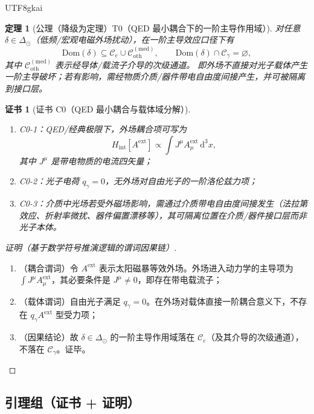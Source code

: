 \documentclass[12pt]{article}
\newtheorem{theorem}{定理}[section]
\newtheorem{Certificate}{证书}[section]
\begin{document}
\begin{CJK*}{UTF8}{gkai}
\begin{theorem}[公理（降级为定理）T0（QED 最小耦合下的一阶主导作用域）]
\label{thm:tex27-ch16b-t0}
对任意 $\delta\in\Delta_{\odot}$（低频/宏观电磁外场扰动），在一阶主导效应口径下有
\[
  \mathrm{Dom}(\delta)\subseteq
  \mathcal{C}_{e}\cup\mathcal{C}_{\mathrm{oth}}^{(\mathrm{med})},
  \qquad
  \mathrm{Dom}(\delta)\cap\mathcal{C}_{\gamma}=\varnothing,
\]
其中 $\mathcal{C}_{\mathrm{oth}}^{(\mathrm{med})}$ 表示经导体/载流子介导的次级通道。
即外场不直接对光子载体产生一阶主导破坏；若有影响，需经物质介质/器件带电自由度间接产生，并可被隔离到接口层。
\end{theorem}

\begin{Certificate}[证书 C0（QED 最小耦合与载体域分解）]
\label{cert:tex27-ch16b-c0}
\begin{enumerate}
  \item C0-1：QED/经典极限下，外场耦合项可写为
  \[
    H_{\mathrm{int}}[A^{\mathrm{ext}}]\propto \int J^\mu A^{\mathrm{ext}}_{\mu}\,\mathrm{d}^3x,
  \]
  其中 $J^\mu$ 是带电物质的电流四矢量；
  \item C0-2：光子电荷 $q_{\gamma}=0$，无外场对自由光子的一阶洛伦兹力项；
  \item C0-3：介质中光场若受外磁场影响，需通过介质带电自由度间接发生（法拉第效应、折射率微扰、器件偏置漂移等），其可隔离位置在介质/器件接口层而非光子本体。
\end{enumerate}
\end{Certificate}

\begin{proof}[证明（基于数学符号推演逻辑的谓词因果链）]
\begin{enumerate}
  \item（耦合谓词）令 $A^{\mathrm{ext}}$ 表示太阳磁暴等效外场。外场进入动力学的主导项为
  $\int J^\mu A^{\mathrm{ext}}_{\mu}$，其必要条件是 $J^\mu\neq 0$，即存在带电载流子；
  \item（载体谓词）自由光子满足 $q_{\gamma}=0$。在外场对载体直接一阶耦合意义下，不存在 $q_{\gamma}A^{\mathrm{ext}}$ 型受力项；
  \item（因果结论）故 $\delta\in\Delta_{\odot}$ 的一阶主导作用域落在 $\mathcal{C}_{e}$（及其介导的次级通道），不落在 $\mathcal{C}_{\gamma}$。证毕。
\end{enumerate}
\end{proof}

\subsection{引理组（证书 + 证明）}
\label{subsec:tex27-ch16b-lemmas}


\end{CJK*}
\end{document}
